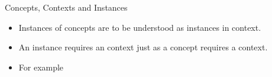 \begin{frame}{Concepts, Contexts  and Instances}
\begin{itemize}
\item Instances of concepts are to be understood as instances in context.
\item An instance requires an context just as a concept requires a context.
\pause
\item For example 
\end{itemize}
\vspace{1cm}
\end{frame}




